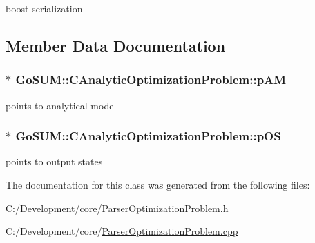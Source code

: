 boost serialization 



\subsection{Member Data Documentation}
\hypertarget{class_go_s_u_m_1_1_c_analytic_optimization_problem_af428e86dcb3e73b0ac076e269a9e0e0a}{
\subsubsection[{p\-A\-M}]{$\ast$ Go\-S\-U\-M\-::\-C\-Analytic\-Optimization\-Problem\-::p\-A\-M\hspace{0.3cm}{\ttfamily [protected]}}}\label{class_go_s_u_m_1_1_c_analytic_optimization_problem_af428e86dcb3e73b0ac076e269a9e0e0a}
points to analytical model \hypertarget{class_go_s_u_m_1_1_c_analytic_optimization_problem_abccbba115de9d825b2658de2a20a1197}{
\subsubsection[{p\-O\-S}]{$\ast$ Go\-S\-U\-M\-::\-C\-Analytic\-Optimization\-Problem\-::p\-O\-S\hspace{0.3cm}{\ttfamily [protected]}}}\label{class_go_s_u_m_1_1_c_analytic_optimization_problem_abccbba115de9d825b2658de2a20a1197}


points to output states 



The documentation for this class was generated from the following files\-:\begin{DoxyCompactItemize}
\item 
C\-:/\-Development/core/\hyperlink{_parser_optimization_problem_8h}{Parser\-Optimization\-Problem.\-h}\item 
C\-:/\-Development/core/\hyperlink{_parser_optimization_problem_8cpp}{Parser\-Optimization\-Problem.\-cpp}\end{DoxyCompactItemize}
